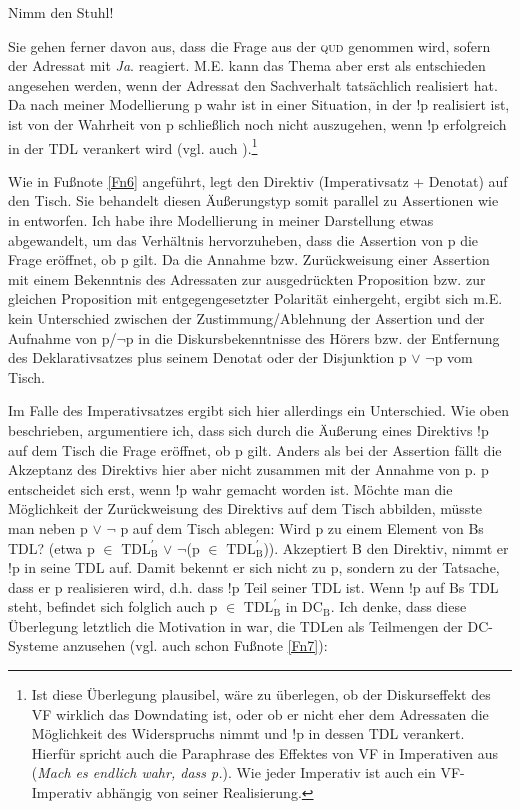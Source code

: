 \begin{exe}
	\ex\label{568}  
	Nimm den Stuhl!
\end{exe}
Sie gehen ferner davon aus, dass die Frage aus der \textsc{qud} genommen wird, sofern der Adressat mit \textit{Ja}. reagiert. M.E. kann das Thema aber erst als entschieden angesehen werden, wenn der Adressat den Sachverhalt tatsächlich realisiert hat. Da nach meiner Modellierung p wahr ist in einer Situation, in der !p realisiert ist, ist von der Wahrheit von p schließlich noch nicht auszugehen, wenn !p erfolg\-reich in der TDL verankert wird (vgl. auch \citealt[7]{Potts2003}).\footnote{Ist diese Überlegung plausibel, wäre zu überlegen, ob der Diskurseffekt des VF wirklich das Downdating ist, oder ob er nicht eher dem Adressaten die Möglichkeit des Widerspruchs nimmt und !p in dessen TDL verankert. Hierfür spricht auch die Paraphrase des Effektes von VF in Imperativen aus \citet[119]{Hoehle1992} (\textit{Mach es endlich wahr, dass p.}). Wie jeder Imperativ ist auch ein VF-Imperativ abhängig von seiner Realisierung.}

Wie in Fußnote \ref{Fn6} angeführt, legt \citet[323]{Farkas2011} den Direktiv (Imperativsatz + Denotat) auf den Tisch. Sie behandelt diesen Äußerungstyp somit parallel zu Assertionen wie in \citet{Farkas2010} entworfen. Ich habe ihre Modellierung in meiner Darstellung etwas abgewandelt, um das Verhältnis hervorzuheben, dass die Assertion von p die Frage eröffnet, ob p gilt. Da die Annahme bzw. Zurückweisung einer Assertion mit einem Bekenntnis des Adressaten zur ausgedrückten Proposition bzw. zur gleichen Proposition mit entgegengesetzter Polarität einhergeht, ergibt sich m.E. kein Unterschied zwischen der Zustimmung/Ablehnung der Assertion und der Aufnahme von p/$\neg$p in die Diskursbekenntnisse des Hörers bzw. der Entfernung des Deklarativsatzes plus seinem Denotat oder der Disjunktion p $\vee$ $\neg$p vom Tisch. 

Im Falle des Imperativsatzes  ergibt sich hier allerdings ein Unterschied. Wie oben beschrieben, argumentiere ich, dass sich durch die Äußerung eines Direktivs !p auf dem Tisch die Frage eröffnet, ob p gilt. Anders als bei der Assertion fällt die Akzeptanz des Direktivs hier aber nicht zusammen mit der Annahme von p. p entscheidet sich erst, wenn !p wahr gemacht worden ist. Möchte man die Möglichkeit der Zurückweisung des Direktivs auf dem Tisch abbilden, müsste man neben p $\vee$ $\neg$ p auf dem Tisch ablegen: Wird p zu einem Element von Bs TDL? (etwa p $\in$ $\textrm{TDL}^{\prime}_{\textrm{B}}$ $\vee$ $\neg$(p $\in$ $\textrm{TDL}^{\prime}_{\textrm{B}}$)). Akzeptiert B den Direktiv, nimmt er !p in seine TDL auf. Damit bekennt er sich nicht zu p, sondern zu der Tatsache, dass er p realisieren wird, d.h. dass !p Teil seiner TDL ist. Wenn !p auf Bs TDL steht, befindet sich folglich auch p $\in$ $\textrm{TDL}^{\prime}_{\textrm{B}}$ in $\textrm{DC}_{\textrm{B}}$. Ich denke, dass diese Überlegung letztlich die Motivation in \citet[223/324]{Farkas2011} war, die TDLen als Teilmengen der DC-Systeme anzusehen (vgl. auch schon Fußnote \ref{Fn7}):

